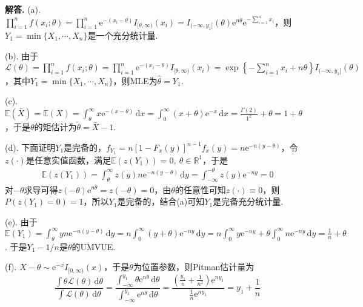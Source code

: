 \documentclass[12pt, a4paper, oneside]{ctexart}
\newenvironment{solution}[1][]{\par\noindent\textbf{#1解答. }}{\smallskip\par}  %
\def\R{\mathbb{R}}          %
\def\E{\mathbb{E}}          %
\def\d{\mathrm{d}}          %
\def\e{\mathrm{e}}          %
\def\L{\mathcal{L}}         %
\def\add{\vspace{1ex}}      %
\begin{document}
\begin{solution}
    (a). $\prod_{i=1}^nf(x_i;\theta) = \prod_{i=1}^n\e^{-(x_i-\theta)}I_{[\theta,\infty)}(x_i) = I_{(-\infty, y_1]}(\theta)\e^{n\theta}\e^{-\sum\limits_{i=1}^nx_i}$，则$Y_1 = \min\{X_1,\cdots,X_n\}$是一个充分统计量.

    (b). 由于$\L(\theta) = \prod_{i=1}^nf(x_i;\theta) = \prod_{i=1}^n\e^{-(x_i-\theta)}I_{[\theta,\infty)}(x_i) = \exp\left\{-\sum_{i=1}^nx_i+n\theta\right\}I_{(-\infty,y_1]}(\theta)$，其中$Y_1 = \min\{X_1,\cdots,X_n\}$，则MLE为$\hat{\theta}=Y_1$.\add

    (c). $\E(\bar{X}) = \E(X) = \int_{\theta}^\infty x\e^{-(x-\theta)}\,\d x = \int_{0}^\infty(x+\theta)\e^{-x}\,\d x = \frac{\Gamma(2)}{1^2}+\theta = 1+\theta$，于是$\theta$的矩估计为$\tilde{\theta}=\bar{X}-1$.

    (d). 下面证明$Y_1$是完备的，$f_{Y_1}=n[1-F_x(y)]^{n-1}f_x(y) = n\e^{-n(y-\theta)}$，令$z(\cdot)$是任意实值函数，满足$\E(z(Y_1)) = 0,\ \theta\in\R^1$，于是
    \begin{align*}
        \E(z(Y_1)) = \int_\theta^\infty z(y)n\e^{-n(y-\theta)}\,\d y = \int_{-\infty}^{-\theta}z(y)\e^{-ny}=0
    \end{align*}
    对$-\theta$求导可得$z(-\theta)\e^{n\theta} = z(-\theta) = 0$，由$\theta$的任意性可知$z(\cdot)\equiv 0$，则$P(z(Y_1)=0) = 1$，所以$Y_1$是完备的，结合(a)可知$Y_1$是完备充分统计量.\add

    (e). 由于$\E(Y_1) = \int_\theta^\infty yn\e^{-n(y-\theta)}\,\d y = n\int_0^\infty (y+\theta)\e^{-ny}\,\d y= n\int_0^\infty y\e^{-ny}+\theta\int_0^\infty n\e^{-ny}\,\d y = \frac{1}{n}+\theta$. 于是$Y_1-1/n$是$\theta$的UMVUE.

    (f). $X-\theta\sim\e^{-x}I_{[0,\infty)}(x)$，于是$\theta$为位置参数，则Pitman估计量为
    \begin{equation*}
        \frac{\int\theta\L(\theta)\,\d\theta}{\int\L(\theta)\,\d\theta}=\frac{\int_{-\infty}^{y_1}\theta\e^{n\theta}\,\d\theta}{\int_{-\infty}^{y_1}\e^{n\theta}\,\d\theta}=\frac{\left(\frac{y_1}{n}+\frac{1}{n^2}\right)\e^{ny_1}}{\frac{1}{n}\e^{ny_1}} = y_1+\frac{1}{n}
    \end{equation*}


\end{solution}
\end{document}
